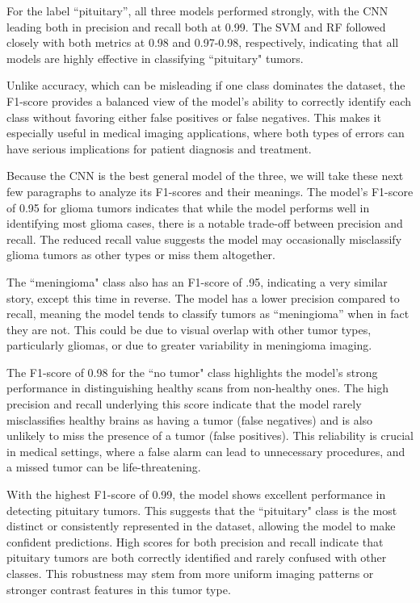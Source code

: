 \documentclass[conference]{IEEEtran}
\begin{document}
For the label ``pituitary'', all three models performed strongly, with the CNN leading both in precision and recall both at 0.99. The SVM and RF followed closely with both metrics at 0.98 and 0.97-0.98, respectively, indicating that all models are highly effective in classifying ``pituitary" tumors.

Unlike accuracy, which can be misleading if one class dominates the dataset, the F1-score provides a balanced view of the model's ability to correctly identify each class without favoring either false positives or false negatives. This makes it especially useful in medical imaging applications, where both types of errors can have serious implications for patient diagnosis and treatment.

Because the CNN is the best general model of the three, we will take these next few paragraphs to analyze its F1-scores and their meanings. The model's F1-score of 0.95 for glioma tumors indicates that while the model performs well in identifying most glioma cases, there is a notable trade-off between precision and recall. The reduced recall value suggests the model may occasionally misclassify glioma tumors as other types or miss them altogether.

The ``meningioma" class also has an F1-score of .95, indicating a very similar story, except this time in reverse. The model has a lower precision compared to recall, meaning the model tends to classify tumors as ``meningioma'' when in fact they are not. This could be due to visual overlap with other tumor types, particularly gliomas, or due to greater variability in meningioma imaging. 

The F1-score of 0.98 for the ``no tumor" class highlights the model's strong performance in distinguishing healthy scans from non-healthy ones. The high precision and recall underlying this score indicate that the model rarely misclassifies healthy brains as having a tumor (false negatives) and is also unlikely to miss the presence of a tumor (false positives). This reliability is crucial in medical settings, where a false alarm can lead to unnecessary procedures, and a missed tumor can be life-threatening.

With the highest F1-score of 0.99, the model shows excellent performance in detecting pituitary tumors. This suggests that the ``pituitary" class is the most distinct or consistently represented in the dataset, allowing the model to make confident predictions. High scores for both precision and recall indicate that pituitary tumors are both correctly identified and rarely confused with other classes. This robustness may stem from more uniform imaging patterns or stronger contrast features in this tumor type.
\end{document}
